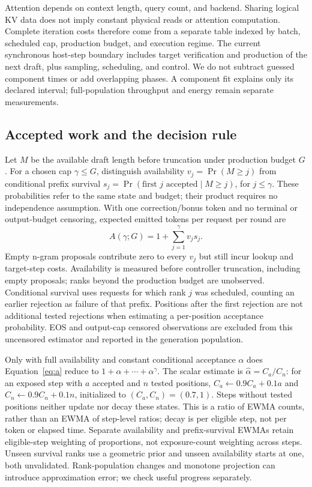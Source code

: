 \documentclass[10pt,twocolumn]{article}
\begin{document}
Attention depends on context length, query count, and backend. Sharing logical KV data does not imply constant physical reads or attention computation. Complete iteration costs therefore come from a separate table indexed by batch, scheduled cap, production budget, and execution regime. The current synchronous host-step boundary includes target verification and production of the next draft, plus sampling, scheduling, and control. We do not subtract guessed component times or add overlapping phases. A component fit explains only its declared interval; full-population throughput and energy remain separate measurements.

\subsection{Accepted work and the decision rule}
Let $M$ be the available draft length before truncation under production budget $G$. For a chosen cap $\gamma\leq G$, distinguish availability $v_j=\Pr(M\geq j)$ from conditional prefix survival $s_j=\Pr(\text{first }j\text{ accepted}\mid M\geq j)$, for $j\leq\gamma$. These probabilities refer to the same state and budget; their product requires no independence assumption. With one correction/bonus token and no terminal or output-budget censoring, expected emitted tokens per request per round are
\begin{equation}\label{eq:a}
A(\gamma;G)=1+\sum_{j=1}^{\gamma}v_j s_j.
\end{equation}
Empty n-gram proposals contribute zero to every $v_j$ but still incur lookup and target-step costs. Availability is measured before controller truncation, including empty proposals; ranks beyond the production budget are unobserved. Conditional survival uses requests for which rank $j$ was scheduled, counting an earlier rejection as failure of that prefix. Positions after the first rejection are not additional tested rejections when estimating a per-position acceptance probability. EOS and output-cap censored observations are excluded from this uncensored estimator and reported in the generation population.

Only with full availability and constant conditional acceptance $\alpha$ does Equation~\ref{eq:a} reduce to $1+\alpha+\cdots+\alpha^\gamma$. The scalar estimate is $\hat\alpha=C_a/C_n$: for an exposed step with $a$ accepted and $n$ tested positions, $C_a\leftarrow0.9C_a+0.1a$ and $C_n\leftarrow0.9C_n+0.1n$, initialized to $(C_a,C_n)=(0.7,1)$. Steps without tested positions neither update nor decay these states. This is a ratio of EWMA counts, rather than an EWMA of step-level ratios; decay is per eligible step, not per token or elapsed time. Separate availability and prefix-survival EWMAs retain eligible-step weighting of proportions, not exposure-count weighting across steps. Unseen survival ranks use a geometric prior and unseen availability starts at one, both unvalidated. Rank-population changes and monotone projection can introduce approximation error; we check useful progress separately.
\end{document}
